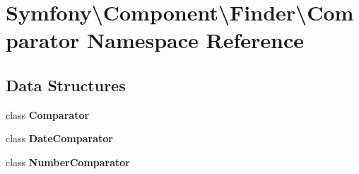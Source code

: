 \section{Symfony\textbackslash{}Component\textbackslash{}Finder\textbackslash{}Comparator Namespace Reference}
\label{namespace_symfony_1_1_component_1_1_finder_1_1_comparator}
\subsection*{Data Structures}
\begin{DoxyCompactItemize}
\item 
class {\bf Comparator}
\item 
class {\bf Date\+Comparator}
\item 
class {\bf Number\+Comparator}
\end{DoxyCompactItemize}
